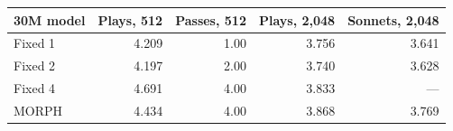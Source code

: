 \begin{center}\small\begin{tabular}{lrrrr}\toprule
30M model & Plays, 512 & Passes, 512 & Plays, 2,048 & Sonnets, 2,048\\\midrule
Fixed 1 & 4.209 & 1.00 & 3.756 & 3.641\\
Fixed 2 & 4.197 & 2.00 & 3.740 & 3.628\\
Fixed 4 & 4.691 & 4.00 & 3.833 & ---\\
MORPH & 4.434 & 4.00 & 3.868 & 3.769\\
\bottomrule\end{tabular}\end{center}
